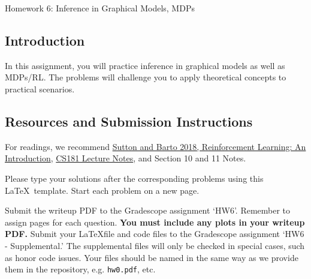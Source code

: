 \documentclass[submit]{../harvardml}
\begin{document}
\begin{center}
{\Large Homework 6: Inference in Graphical Models, MDPs}\\
\end{center}

\subsection*{Introduction}

In this assignment, you will practice inference in graphical models as
well as MDPs/RL. The problems will challenge you to apply theoretical concepts to practical scenarios.

\subsection*{Resources and Submission Instructions}

For readings, we recommend \href{http://incompleteideas.net/book/the-book-2nd.html}{Sutton and Barto 2018, Reinforcement Learning: An Introduction}, \href{https://harvard-ml-courses.github.io/cs181-web/}{CS181  Lecture Notes}, and Section 10 and 11 Notes.

Please type your solutions after the corresponding problems using this \LaTeX\ template. Start each problem on a new page.

Submit the writeup PDF to the Gradescope assignment `HW6'. Remember to assign pages for each question. \textbf{You must include any plots in your writeup PDF.} Submit your \LaTeX file and code files to the Gradescope assignment `HW6 - Supplemental.' The supplemental files will only be checked in special cases, such as honor code issues. Your files should be named in the same way as we provide them in the repository, e.g. \texttt{hw0.pdf}, etc.
\\

\newpage
\end{document}
